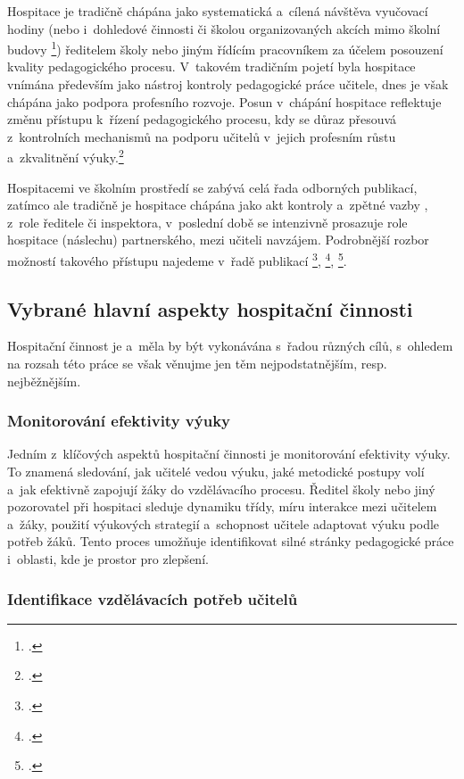 Hospitace je tradičně chápána jako systematická a~cílená návštěva vyučovací hodiny (nebo i~dohledové činnosti či školou organizovaných akcích mimo školní budovy \footcite[14]{hospitace-funkce}) ředitelem školy nebo jiným řídícím pracovníkem za účelem posouzení kvality pedagogického procesu. V~takovém tradičním pojetí byla hospitace vnímána především jako nástroj kontroly pedagogické práce učitele, dnes je však chápána jako podpora profesního rozvoje. Posun v~chápání hospitace reflektuje změnu přístupu k~řízení pedagogického procesu, kdy se důraz přesouvá z~kontrolních mechanismů na podporu učitelů v~jejich profesním růstu a~zkvalitnění výuky.\footcite[139]{ped-proces-rizeni}

Hospitacemi ve školním prostředí se zabývá celá řada odborných publikací, zatímco ale tradičně je hospitace chápána jako akt kontroly a~zpětné vazby , z~role ředitele či inspektora, v~poslední době se intenzivně prosazuje  role hospitace (náslechu) partnerského, mezi učiteli navzájem. Podrobnější rozbor možností takového přístupu najedeme v~řadě publikací \footcite{ucime-ucit-se}, \footcite{metody-a-formy}, \footcite{rozvijejici-hospitace}. 

\subsection{Vybrané hlavní aspekty hospitační činnosti}

Hospitační činnost je a~měla by být vykonávána s~řadou různých cílů, s~ohledem na rozsah této práce se však věnujme jen těm nejpodstatnějším, resp. nejběžnějším.

\subsubsection{Monitorování efektivity výuky}

Jedním z~klíčových aspektů hospitační činnosti je monitorování efektivity výuky. To znamená sledování, jak učitelé vedou výuku, jaké metodické postupy volí a~jak efektivně zapojují žáky do vzdělávacího procesu. Ředitel školy nebo jiný pozorovatel při hospitaci sleduje dynamiku třídy, míru interakce mezi učitelem a~žáky, použití výukových strategií a~schopnost učitele adaptovat výuku podle potřeb žáků. Tento proces umožňuje identifikovat silné stránky pedagogické práce i~oblasti, kde je prostor pro zlepšení.

\subsubsection{Identifikace vzdělávacích potřeb učitelů}

